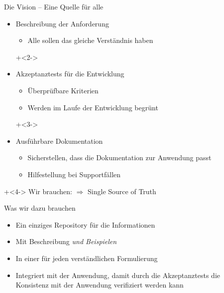 \begin{frame}{Die Vision -- Eine Quelle für alle}

\begin{itemize}
	\item Beschreibung der Anforderung
	\begin{itemize}
		\item Alle sollen das gleiche Verständnis haben
	\end{itemize}

\onslide+<2->
	
	\item Akzeptanztests für die Entwicklung
	\begin{itemize}
		\item Überprüfbare Kriterien
		\item Werden im Laufe der Entwicklung \glqq begrünt\grqq
	\end{itemize}

\onslide+<3->
	
	\item Ausführbare Dokumentation
	\begin{itemize}
		\item Sicherstellen, dass die Dokumentation zur Anwendung passt
		\item Hilfestellung bei Supportfällen
	\end{itemize}
\end{itemize}

\onslide+<4->
Wir brauchen:	
$\Rightarrow$ Single Source of Truth

\end{frame}


\begin{frame}{Was wir dazu brauchen}

\begin{itemize}
	\item Ein einziges Repository für die Informationen
	\item Mit Beschreibung \em und \em Beispielen
	\item In einer für jeden verständlichen Formulierung
	\item Integriert mit der Anwendung, damit durch die Akzeptanztests die Konsistenz mit der Anwendung verifiziert werden kann
\end{itemize}

\end{frame}



